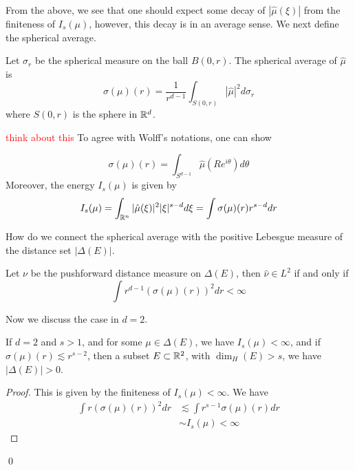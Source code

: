 From the above, we see that one should expect some decay of $|\hat{\mu}(\xi)|$ from the finiteness of $I_s(\mu)$, however, this decay is in an average sense. We next define the spherical average.
\begin{definition}
    Let $\sigma_r$ be the spherical measure on the ball $B(0,r)$. The spherical average of $\hat{\mu}$ is 
    \begin{equation*}
        \sigma(\mu)(r)=\frac{1}{r^{d-1}}\int_{S(0,r)} |\hat{\mu}|^2d\sigma_r
    \end{equation*}
    where $S(0,r)$ is the sphere in $\mathbb{R}^d$.
\end{definition}
\textcolor{red}{think about this} To agree with Wolff's notations, one can show
\begin{proposition}
    \begin{equation*}
        \sigma(\mu)(r)=\int_{S^{d-1}}\hat{\mu}(Re^{i\theta})d\theta
    \end{equation*}
    Moreover, the energy $I_s(\mu)$ is given by 
    \begin{equation*}
        I_s(\mu)=\int_{\mathbb{R}^n}|\hat{\mu}(\xi)|^2|\xi|^{s-d}d\xi=\int \sigma(\mu)(r)r^{s-d}dr
    \end{equation*}
\end{proposition}
How do we connect the spherical average with the positive Lebesgue measure of the distance set $|\Delta(E)|$.
\begin{proposition}
    Let $\nu$ be the pushforward distance measure on $\Delta(E)$, then $\hat{\nu}\in L^2$ if and only if 
    \begin{equation*}
        \int r^{d-1}(\sigma(\mu)(r))^2 dr<\infty
    \end{equation*}
\end{proposition}
Now we discuss the case in $d=2$. 
\begin{corollary}
    If $d=2$ and $s>1$, and for some $\mu\in\Delta(E)$, we have $I_s(\mu)<\infty$, and if $\sigma(\mu)(r)\lesssim r^{s-2}$, then a subset $E\subset\mathbb{R}^2$, with $\dim_H(E)>s$, we have $|\Delta(E)|>0$.
\end{corollary}
\begin{proof}
    This is given by the finiteness of $I_s(\mu)<\infty$. We have 
    \begin{align*}
        \int r(\sigma(\mu)(r))^2dr&\lesssim \int r^{s-1}\sigma(\mu)(r)dr\\
        &\sim I_s(\mu)<\infty
    \end{align*}
\end{proof}
\qed

